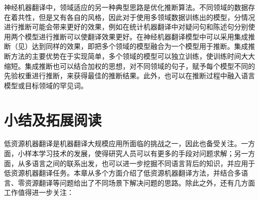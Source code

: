 \parinterval 神经机器翻译中，领域适应的另一种典型思路是优化推断算法。不同领域的数据存在着共性，但是又有各自的风格，因此对于使用多领域数据训练出的模型，分情况进行推断可能会带来更好的效果，例如在统计机器翻译中对疑问句和陈述句分别使用两个模型进行推断可以使翻译效果更好。在神经机器翻译模型中可以采用集成推断（见{\chapterfourteen}）达到同样的效果，即把多个领域的模型融合为一个模型用于推断。集成推断方法的主要优势在于实现简单，多个领域的模型可以独立训练，使训练时间大大缩短。集成推断也可以结合加权的思想，对不同领域的句子，赋予每个模型不同的先验权重进行推断，来获得最佳的推断结果。此外，也可以在推断过程中融入语言模型或目标领域的罕见词。


\section{小结及拓展阅读}

低资源机器翻译是机器翻译大规模应用所面临的挑战之一，因此也备受关注。一方面，小样本学习技术的发展，使得研究人员可以有更多的手段对问题求解；另一方面，从多语言之间的联系出发，也可以进一步挖掘不同语言背后的知识，并应用于低资源机器翻译任务。本章从多个方面介绍了低资源机器翻译方法，并结合多语言、零资源翻译等问题给出了不同场景下解决问题的思路。除此之外，还有几方面工作值得进一步关注：

